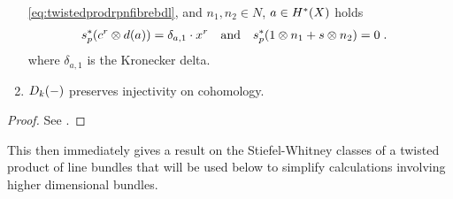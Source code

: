 \begin{Thm}
\begin{enumerate}
    \eqref{eq:twistedprodrpnfibrebdl}, and $n_1,n_2\in N$, $a\in H^*(X)$ holds
    \begin{align}\label{eq:twistedprodcohom:section}
      {s}^*_p(c^r\otimes d(a)) &= \delta_{a,1} \cdot x^r
      &\text{and}&
      &{s}^*_p(1\otimes n_1 + s\otimes n_2) &= 0
      \;.
    \end{align}
    where $\delta_{a,1}$ is the Kronecker delta.
  \item\label{item:twistedprod:preservescohominj}
    $D_{k}({-})$ preserves injectivity on cohomology.
  \end{enumerate}
  \begin{proof}
    See \cite[Theorem~7.1]{brown}.
  \end{proof}
\end{Thm}

This then immediately gives a result on the Stiefel-Whitney classes of
a twisted product of line bundles that will be used below to simplify
calculations involving higher dimensional bundles.
